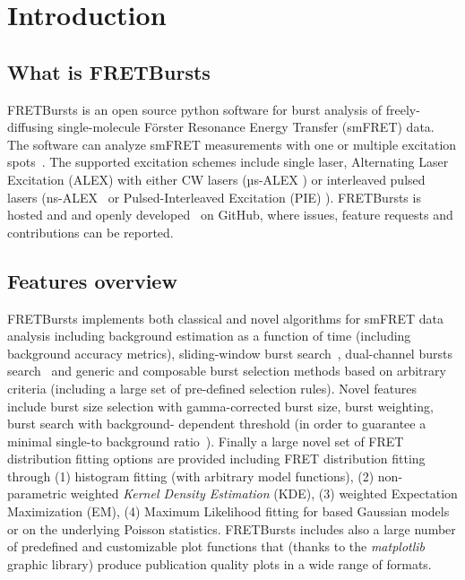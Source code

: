 \section{Introduction}

\subsection{What is FRETBursts}

FRETBursts is an open source python software for burst analysis of freely-diffusing 
single-molecule Förster Resonance Energy Transfer (smFRET) data. 
The software can analyze smFRET measurements
with one or multiple excitation spots~\cite{Ingargiola_2013}. The supported 
excitation schemes include single laser, Alternating Laser Excitation (ALEX) 
with either CW lasers (µs-ALEX \cite{Kapanidis_2005}) 
or interleaved pulsed lasers (ns-ALEX~\cite{Laurence_2005} or 
Pulsed-Interleaved Excitation (PIE) \cite{M_ller_2005}). 
FRETBursts is hosted and and openly developed~\cite{Prli__2012} on GitHub, where
issues, feature requests and contributions can be reported.

\subsection{Features overview}

FRETBursts implements both classical and novel algorithms for smFRET data analysis 
including background estimation as a function of time (including background accuracy 
metrics), sliding-window burst search~\cite{Eggeling_1998}, dual-channel bursts search~\cite{Nir_2006} and
generic and composable burst selection methods based on arbitrary criteria 
(including a large set of pre-defined selection rules). Novel features include burst size
selection with gamma-corrected burst size, burst weighting, burst search with background-
dependent threshold (in order to guarantee a minimal single-to background ratio~\cite{Michalet_2012}).
Finally a large novel set of FRET distribution fitting options are provided including
FRET distribution fitting through (1) histogram fitting (with arbitrary model functions), 
(2)  non-parametric weighted \textit{Kernel Density Estimation} (KDE), (3) weighted 
Expectation Maximization (EM), (4) Maximum Likelihood fitting for based Gaussian models 
or on the underlying Poisson statistics. FRETBursts includes also a large number of
predefined and customizable plot functions that (thanks to the \textit{matplotlib} 
graphic library) produce publication quality plots in a wide range of formats.

